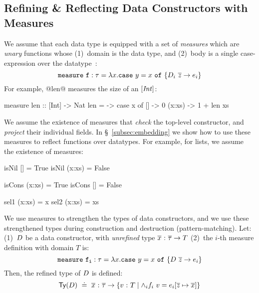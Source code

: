 \subsection{Refining \& Reflecting Data Constructors with Measures}
\label{subsec:measures}
\label{subsec:list}


We assume that each data type is equipped with
a set of \emph{measures} which are \emph{unary}
functions whose (1)~domain is the data type, and
(2)~body is a single case-expression over the
datatype~\cite{Vazou14}:
%
$$\mathtt{measure}\ \mathtt{f}:\mathtt{\tau} = \lambda x.  \mathtt{case}\ y=x\ \mathtt{of}\ \{ D_i\ \overline{z} \rightarrow e_i\} $$
%
For example, @len@ measures the size of an $[\mathit{Int}]$:
%
\begin{code}
  measure len :: [Int] -> Nat
  len = \x -> case x of
                []     -> 0
                (x:xs) -> 1 + len xs
\end{code}

%
We assume the existence of measures that
\emph{check} the top-level constructor,
and \emph{project} their individual fields.
%
In \S~\ref{subsec:embedding} we show how to
use these measures to reflect functions over
datatypes.
%
%
For example, for lists, we assume the existence of measures:
%
\begin{code}
  isNil []      = True
  isNil (x:xs)  = False

  isCons (x:xs) = True
  isCons []     = False

  sel1 (x:xs)   = x
  sel2 (x:xs)   = xs
\end{code}

%
We use measures to strengthen the types
of data constructors, and we use these
strengthened types during construction
and destruction (pattern-matching).
%
Let:
%
(1)~$D$ be a data constructor,
   with \emph{unrefined} type
   ${\overline{x}} \ \text{:}\ {\overline{\tau}} \rightarrow T$
%
(2)~the $i$-th measure definition with
   domain $T$ is:
%
$$\mathtt{measure}\ \mathtt{f_i}:\mathtt{\tau} = \lambda x.  \mathtt{case}\ y=x\ \mathtt{of}\ \{ D\ \overline{z} \rightarrow e_{i}\} 
$$
%
Then, the refined type of $D$ is defined:
$$
\mathsf{Ty}({D}) \ \doteq\ 
   {\overline{x}} \ \text{:}\ {\overline{\tau}} \rightarrow \{ {v} \ \text{:}\ {T} \mid  \wedge_i f_i\ v = {e_{i}}[{{\overline{z}} \mapsto {\overline{x}}}] \}
$$

